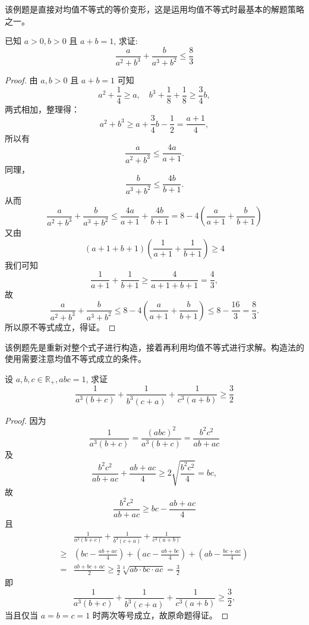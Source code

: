 \begin{analysis}
  该例题是直接对均值不等式的等价变形，这是运用均值不等式时最基本的解题策略之一。
\end{analysis}


\begin{example}
  \parencite{贾静2017关于均值不等式的教学探究及应用}已知 $a>0, b>0$ 且 $a+b=1$, 求证: \[\frac{a}{a^{2}+b^{3}}+\frac{b}{a^{3}+b^{2}} \leq \frac{8}{3}\]
\end{example}

\begin{proof}
  由 $a, b>0$ 且 $a+b=1$ 可知
  \[
  a^{2}+\frac{1}{4} \geq a, \quad b^{3}+\frac{1}{8}+\frac{1}{8} \geq \frac{3}{4} b,
  \]
  两式相加，整理得：
  \[
    a^{2}+b^{3} \geq a+\frac{3}{4} b-\frac{1}{2}=\frac{a+1}{4},
  \]
  所以有
  \[
    \frac{a}{a^{2}+b^{3}} \leq \frac{4 a}{a+1}.
  \]
  同理，
  \[
    \frac{b}{a^{3}+b^{2}} \leq \frac{4 b}{b+1}.
  \]
  从而
  \[
    \frac{a}{a^{2}+b^{3}}+\frac{b}{a^{3}+b^{2}} \leq \frac{4 a}{a+1}+\frac{4 b}{b+1}=8-4\left(\frac{a}{a+1}+\frac{b}{b+1}\right)
  \]
  又由
  \[
    (a+1+b+1)\left(\frac{1}{a+1}+\frac{1}{b+1}\right) \geq 4
  \]
  我们可知
  \[
    \frac{1}{a+1}+\frac{1}{b+1} \geq \frac{4}{a+1+b+1}=\frac{4}{3},
  \]
  故
  \[
    \frac{a}{a^{2}+b^{3}}+\frac{b}{a^{3}+b^{2}} \leq 8-4\left(\frac{a}{a+1}+\frac{b}{b+1}\right) \leq 8-\frac{16}{3}=\frac{8}{3}.
  \] 所以原不等式成立，得证。
\end{proof}

\begin{analysis}
  该例题先是重新对整个式子进行构造，接着再利用均值不等式进行求解。构造法的使用需要注意均值不等式成立的条件。
\end{analysis}


\begin{example}
  设 $a, b, c \in \mathbb{R}_{+}, a b c=1$, 求证 \[\frac{1}{a^{3}(b+c)}+\frac{1}{b^{3}(c+a)}+\frac{1}{c^{3}(a+b)} \geq \frac{3}{2}\]
\end{example}

\begin{proof}
  因为
  \[
    \frac{1}{a^{3}(b+c)}=\frac{(a b c)^{2}}{a^{3}(b+c)}=\frac{b^{2} c^{2}}{a b+a c}
  \]及
  \[
    \frac{b^{2} c^{2}}{a b+a c}+\frac{a b+a c}{4} \geq 2 \sqrt{\frac{b^{2} c^{2}}{4}}=b c,
  \]故
  \[
    \frac{b^{2} c^{2}}{a b+a c} \geq b c-\frac{a b+a c}{4}
  \]且
  \begin{align*} 
    & \frac{1}{a^{3}(b+c)}+\frac{1}{b^{3}(c+a)}+\frac{1}{c^{3}(a+b)} \\ 
    \geq &\left(b c-\frac{a b+a c}{4}\right)+\left(a c-\frac{a b+b c}{4}\right)+\left(a b-\frac{b c+a c}{4}\right) \\ 
    =& \frac{a b+b c+a c}{2} \geq \frac{3}{2} \sqrt[3]{a b \cdot b c \cdot a c}=\frac{3}{2} 
  \end{align*}
  即
  \[
    \frac{1}{a^{3}(b+c)}+\frac{1}{b^{3}(c+a)}+\frac{1}{c^{3}(a+b)} \geq \frac{3}{2},
  \]
  当且仅当 $a=b=c=1$ 时两次等号成立，故原命题得证。
\end{proof}


